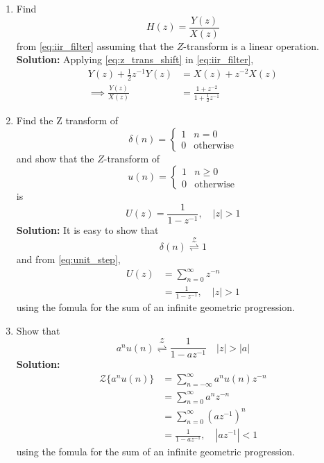 \documentclass[journal,12pt,twocolumn]{IEEEtran}
\newcommand{\solution}{\noindent \textbf{Solution: }}
\providecommand{\abs}[1]{\left\vert#1\right\vert}
\providecommand{\ztrans}{\overset{\mathcal{Z}}{ \rightleftharpoons}}
\numberwithin{equation}{section}
\renewcommand\thesection{\arabic{section}}
\renewcommand\thesection{\arabic{section}}
\begin{document}
\begin{enumerate}[label=\thesection.\arabic*]
\item Find
%
\begin{equation}
H(z) = \frac{Y(z)}{X(z)}
\end{equation}
%
from  \eqref{eq:iir_filter} assuming that the $Z$-transform is a linear operation.
\\
\solution  Applying \eqref{eq:z_trans_shift} in \eqref{eq:iir_filter},
\begin{align}
Y(z) + \frac{1}{2}z^{-1}Y(z) &= X(z)+z^{-2}X(z)
\\
\implies \frac{Y(z)}{X(z)} &= \frac{1 + z^{-2}}{1 + \frac{1}{2}z^{-1}}
\label{eq:freq_resp}
\end{align}
%
\item Find the Z transform of 
\begin{equation}
\delta(n)
=
\begin{cases}
1 & n = 0
\\
0 & \text{otherwise}
\end{cases}
\end{equation}
and show that the $Z$-transform of
\begin{equation}
\label{eq:unit_step}
u(n)
=
\begin{cases}
1 & n \ge 0
\\
0 & \text{otherwise}
\end{cases}
\end{equation}
is
\begin{equation}
U(z) = \frac{1}{1-z^{-1}}, \quad \abs{z} > 1
\end{equation}
\solution It is easy to show that
\begin{equation}
\delta(n) \ztrans 1
\end{equation}
and from \eqref{eq:unit_step},
\begin{align}
U(z) &= \sum _{n= 0}^{\infty}z^{-n}
\\
&=\frac{1}{1-z^{-1}}, \quad \abs{z} > 1
\end{align}
using the fomula for the sum of an infinite geometric progression.
%
\item Show that 
\begin{equation}
\label{eq:anun}
a^nu(n) \ztrans \frac{1}{1-az^{-1}} \quad \abs{z} > \abs{a}
\end{equation}
\solution 
\begin{align}
     {\mathcal {Z}}\{a^nu(n)\} &=\sum _{n=-\infty }^{\infty }a^nu(n)z^{-n} \\
     &= \sum _{n=0}^{\infty }a^nz^{-n} \\
     &= \sum _{n=0}^{\infty } \left(az^{-1}\right)^n \\
     &= \frac{1}{1-az^{-1}}, \quad \abs{az^{-1}} < 1
\end{align}
using the fomula for the sum of an infinite geometric progression.


\end{enumerate}
\end{document}
